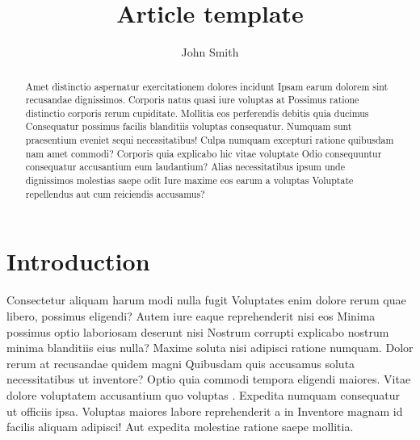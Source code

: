 \documentclass{main}
\title{Article template}
\author{John Smith}
\begin{document}
  \maketitle

  \begin{abstract}

    Amet distinctio aspernatur exercitationem dolores incidunt Ipsam
    earum dolorem sint recusandae dignissimos. Corporis natus quasi iure
    voluptas at Possimus ratione distinctio corporis rerum cupiditate.
    Mollitia eos perferendis debitis quia ducimus Consequatur possimus
    facilis blanditiis voluptas consequatur. Numquam sunt praesentium
    eveniet sequi necessitatibus! Culpa numquam excepturi ratione
    quibusdam nam amet commodi? Corporis quia explicabo hic vitae
    voluptate Odio consequuntur consequatur accusantium eum laudantium?
    Alias necessitatibus ipsum unde dignissimos molestias saepe odit
    Iure maxime eos earum a voluptas Voluptate repellendus aut cum
    reiciendis accusamus? 

  \end{abstract}

  \section{Introduction}

  Consectetur aliquam harum modi nulla fugit Voluptates enim dolore
  rerum quae libero, possimus eligendi? Autem iure eaque reprehenderit
  nisi eos Minima possimus optio laboriosam deserunt nisi Nostrum
  corrupti explicabo nostrum minima blanditiis eius nulla? Maxime soluta
  nisi adipisci ratione numquam.  Dolor rerum at recusandae quidem
  magni Quibusdam quis accusamus soluta necessitatibus ut inventore?
  Optio quia commodi tempora eligendi maiores. Vitae dolore voluptatem
  accusantium quo voluptas \autocite{mckinney_python_2018}. Expedita numquam consequatur ut officiis
  ipsa. Voluptas maiores labore reprehenderit a in Inventore magnam id
  facilis aliquam adipisci! Aut expedita molestiae ratione saepe
  mollitia. 

  \printbibliography
\end{document}

